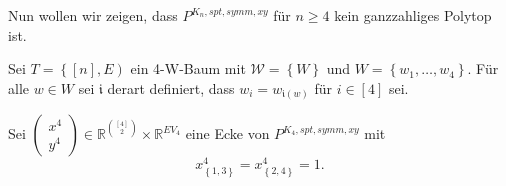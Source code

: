 \documentclass[10p,a4paper,BCOR = 12mm, DIV=15]{scrbook}
\begin{document}
Nun wollen wir zeigen, dass $P^{K_n, spt, symm, xy}$ für $n \geq 4$ kein ganzzahliges Polytop ist.

\begin{Sa}
\label{sa:P_p^symm, xy_nichtganzz}
Sei $T=\left\{\left[n\right], E\right)$ ein 4-W-Baum mit $\mathcal{W} = \left\{W\right\}$ und $W = \left\{w_1, \ldots, w_4\right\}$. Für alle $w \in W$ sei $\mathfrak{i}$ derart definiert, dass $w_i = w_{\mathfrak{i}\left(w\right)}$ für $i \in \left[4\right]$ sei.

Sei $\left(
\begin{array}{c}
x^4 \\
y^4
\end{array}
\right) \in \mathbb{R}^{\left[4\right] \choose 2} \times \mathbb{R}^{EV_4}$ eine Ecke von $P^{K_4, spt, symm, xy}$  mit
\begin{displaymath}
x^4_{\left\{1, 3\right\}} = x^4_{\left\{2, 4\right\}} = 1.
\end{displaymath}


\end{Sa}
\end{document}
